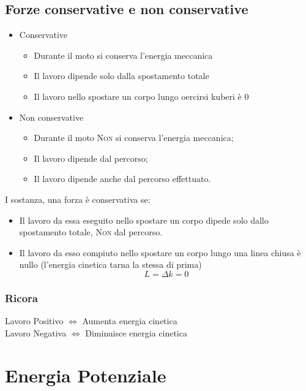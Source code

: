 \documentclass{book}
\begin{document}
\subsection{Forze conservative e non conservative}
\label{sec:forconsenon}
\begin{itemize}
\item Conservative
  \begin{itemize}
  \item Durante il moto si conserva l'energia meccanica
  \item Il lavoro dipende solo dalla spostamento totale
  \item Il lavoro nello spostare un corpo lungo oercirsi kuberi è 0
  \end{itemize}
\item Non conservative
  \begin{itemize}
  \item Durante il moto \textsc{Non} si conserva l'energia meccanica;
  \item Il lavoro dipende dal percorso;
  \item Il lavoro dipende anche dal percorso effettuato. 
  \end{itemize}
\end{itemize}
I sostanza, una forza è conservativa se:
\begin{itemize}
\item Il lavoro da essa eseguito nello spostare un corpo dipede solo dallo spostamento totale, \textsc{Non} dal percorso.
\item Il lavoro da esso compiuto nello spostare un corpo lungo una linea chiusa è nullo (l'energia cinetica tarna la stessa di prima)
  \begin{equation*}
    L=\Delta k=0
  \end{equation*}
\end{itemize}

\subsubsection{Ricora}
\label{sec:ricLavposandNeg}
\begin{center}
  Lavoro Positivo $\Longleftrightarrow$ Aumenta energia cinetica\\
  Lavoro Negativa $\Longleftrightarrow$ Diminuisce energia cinetica
\end{center}

\section{Energia Potenziale}
\label{sec:enpot}
\end{document}
